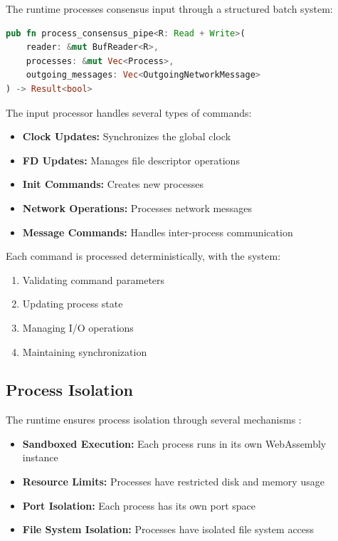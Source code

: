 \documentclass[10pt]{IEEEtran}
\begin{document}
The runtime processes consensus input through a structured batch system:

\begin{lstlisting}[language=Rust]
pub fn process_consensus_pipe<R: Read + Write>(
    reader: &mut BufReader<R>,
    processes: &mut Vec<Process>,
    outgoing_messages: Vec<OutgoingNetworkMessage>
) -> Result<bool>
\end{lstlisting}

The input processor handles several types of commands:
\begin{itemize}
    \item \textbf{Clock Updates:} Synchronizes the global clock
    \item \textbf{FD Updates:} Manages file descriptor operations
    \item \textbf{Init Commands:} Creates new processes
    \item \textbf{Network Operations:} Processes network messages
    \item \textbf{Message Commands:} Handles inter-process communication
\end{itemize}

Each command is processed deterministically, with the system:
\begin{enumerate}
    \item Validating command parameters
    \item Updating process state
    \item Managing I/O operations
    \item Maintaining synchronization
\end{enumerate}

\subsection{Process Isolation}

The runtime ensures process isolation through several mechanisms \cite{replicode2025}:

\begin{itemize}
    \item \textbf{Sandboxed Execution:} Each process runs in its own WebAssembly instance
    \item \textbf{Resource Limits:} Processes have restricted disk and memory usage
    \item \textbf{Port Isolation:} Each process has its own port space
    \item \textbf{File System Isolation:} Processes have isolated file system access
\end{itemize}
\end{document}
